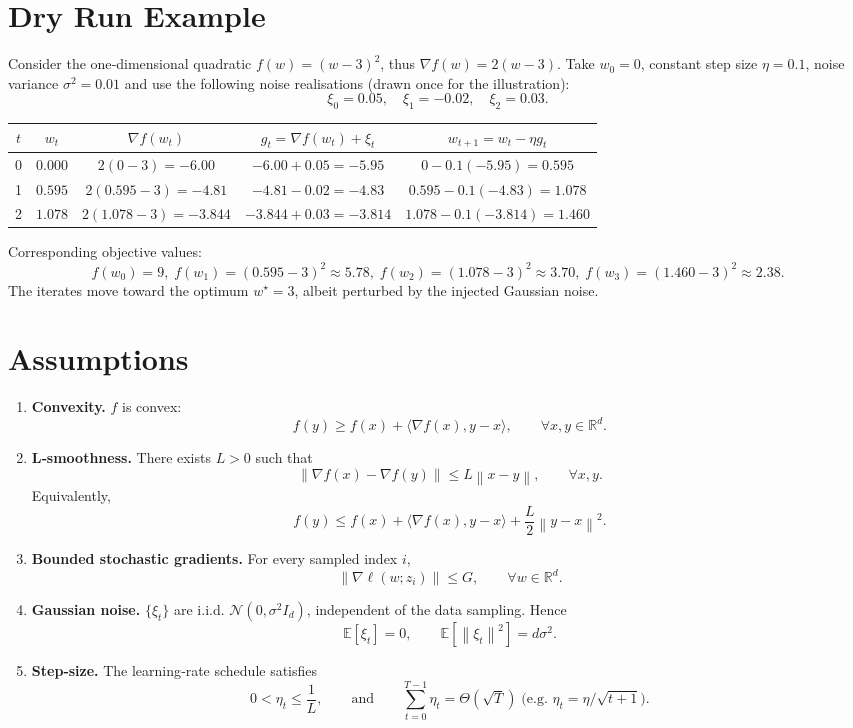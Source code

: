 \documentclass{article}
\newcommand{\E}{\mathbb{E}}
\newcommand{\R}{\mathbb{R}}
\newcommand{\norm}[1]{\left\|#1\right\|}
\newcommand{\ip}[2]{\langle #1,#2\rangle}
\begin{document}
\section*{Dry Run Example}
Consider the one‑dimensional quadratic $f(w)=(w-3)^2$, thus $\nabla f(w)=2(w-3)$.  
Take $w_0=0$, constant step size $\eta=0.1$, noise variance $\sigma^{2}=0.01$ and use the following noise realisations (drawn once for the illustration):
\[
\xi_0=0.05,\quad \xi_1=-0.02,\quad \xi_2=0.03 .
\]

\begin{center}
\begin{tabular}{c|c|c|c|c}
$t$ & $w_t$ & $\nabla f(w_t)$ & $g_t=\nabla f(w_t)+\xi_t$ & $w_{t+1}=w_t-\eta g_t$\\\hline
0 & $0.000$ & $2(0-3)=-6.00$ & $-6.00+0.05=-5.95$ & $0-0.1(-5.95)=0.595$\\
1 & $0.595$ & $2(0.595-3)=-4.81$ & $-4.81-0.02=-4.83$ & $0.595-0.1(-4.83)=1.078$\\
2 & $1.078$ & $2(1.078-3)=-3.844$ & $-3.844+0.03=-3.814$ & $1.078-0.1(-3.814)=1.460$\\
\end{tabular}
\end{center}

Corresponding objective values:
\[
f(w_0)=9,\; f(w_1)= (0.595-3)^2\approx5.78,\;
f(w_2)= (1.078-3)^2\approx3.70,\;
f(w_3)= (1.460-3)^2\approx2.38 .
\]
The iterates move toward the optimum $w^{\star}=3$, albeit perturbed by the injected Gaussian noise.

\newpage
\section*{Assumptions}
\begin{enumerate}[label=\textbf{A\arabic*:},leftmargin=*]
\item \textbf{Convexity.} $f$ is convex:
\[
f(y)\ge f(x)+\ip{\nabla f(x)}{y-x},\qquad\forall x,y\in\R^{d}.
\tag{A1}
\]
\item \textbf{L‑smoothness.} There exists $L>0$ such that
\[
\norm{\nabla f(x)-\nabla f(y)}\le L\norm{x-y},\qquad\forall x,y.
\tag{A2}
\]
Equivalently,
\[
f(y)\le f(x)+\ip{\nabla f(x)}{y-x}+\frac{L}{2}\norm{y-x}^{2}.
\tag{A2'}
\]
\item \textbf{Bounded stochastic gradients.} For every sampled index $i$,
\[
\norm{\nabla\ell(w;z_i)}\le G,\qquad\forall w\in\R^{d}.
\tag{A3}
\]
\item \textbf{Gaussian noise.} $\{\xi_t\}$ are i.i.d. $\mathcal N(0,\sigma^{2}I_d)$, independent of the data sampling. Hence
\[
\E[\xi_t]=0,\qquad \E[\norm{\xi_t}^{2}]=d\sigma^{2}.
\tag{A4}
\]
\item \textbf{Step‑size.} The learning‑rate schedule satisfies
\[
0<\eta_t\le\frac{1}{L},\qquad\text{and}\qquad \sum_{t=0}^{T-1}\eta_t =\Theta(\sqrt{T})\;\text{(e.g. }\eta_t=\eta/\sqrt{t+1}\text{)}.
\tag{A5}
\]
\end{enumerate}
\end{document}
